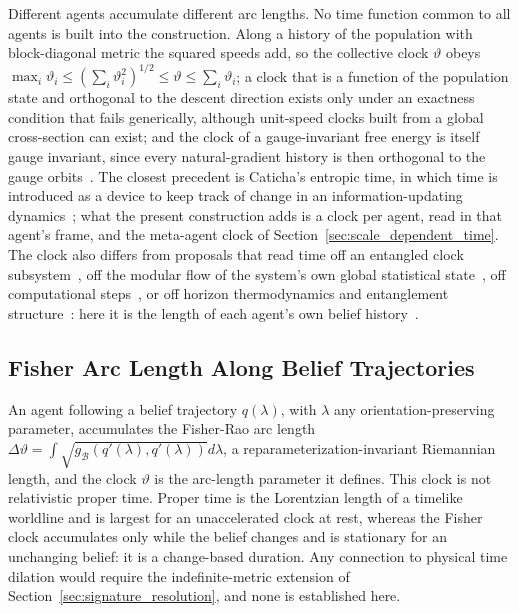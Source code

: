 Different agents accumulate different arc lengths. No time function common to all agents is built into the construction. Along a history of the population with block-diagonal metric the squared speeds add, so the collective clock $\vartheta$ obeys $\max_i \vartheta_i \le (\sum_i \vartheta_i^2)^{1/2} \le \vartheta \le \sum_i \vartheta_i$; a clock that is a function of the population state and orthogonal to the descent direction exists only under an exactness condition that fails generically, although unit-speed clocks built from a global cross-section can exist; and the clock of a gauge-invariant free energy is itself gauge invariant, since every natural-gradient history is then orthogonal to the gauge orbits~\cite[Ch.~7]{DennisGaugeVFE2026}. The closest precedent is Caticha's entropic time, in which time is introduced as a device to keep track of change in an information-updating dynamics~\cite{Caticha2011entropic}; what the present construction adds is a clock per agent, read in that agent's frame, and the meta-agent clock of Section~\ref{sec:scale_dependent_time}. The clock also differs from proposals that read time off an entangled clock subsystem~\cite{PageWootters1983}, off the modular flow of the system's own global statistical state~\cite{ConnesRovelli1994}, off computational steps~\cite{Lloyd2002}, or off horizon thermodynamics and entanglement structure~\cite{Jacobson1995, VanRaamsdonk2010}: here it is the length of each agent's own belief history~\cite{Wheeler1990, Rovelli2004}.

\subsection{Fisher Arc Length Along Belief Trajectories}
\label{sec:fisher_arc_length}

An agent following a belief trajectory $q(\lambda)$, with $\lambda$ any orientation-preserving parameter, accumulates the Fisher-Rao arc length $\Delta\vartheta = \int \sqrt{g_{\mathcal{B}}(q'(\lambda), q'(\lambda))} d\lambda$, a reparameterization-invariant Riemannian length, and the clock $\vartheta$ is the arc-length parameter it defines. This clock is not relativistic proper time. Proper time is the Lorentzian length of a timelike worldline and is largest for an unaccelerated clock at rest, whereas the Fisher clock accumulates only while the belief changes and is stationary for an unchanging belief: it is a change-based duration. Any connection to physical time dilation would require the indefinite-metric extension of Section~\ref{sec:signature_resolution}, and none is established here.


